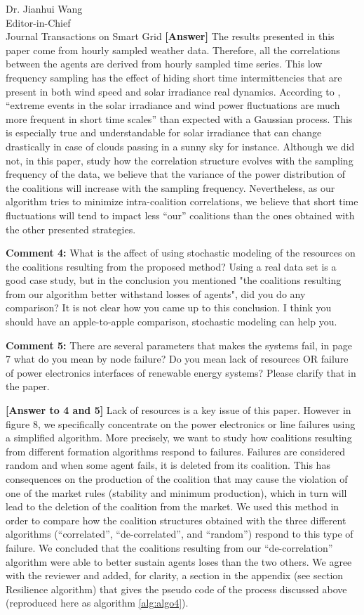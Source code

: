\documentclass{letter}
\begin{document}
\begin{letter}{Dr. Jianhui Wang \\ Editor-in-Chief \\ Journal Transactions on Smart Grid }
\textbf{[Answer]} The results presented in this paper come from hourly sampled weather data. Therefore, all the correlations between the agents are derived from hourly sampled time series. This low frequency sampling has the effect of hiding short time intermittencies that are present in both wind speed and solar irradiance real dynamics. According to \cite{Anvari2015}, “extreme events in the solar irradiance and wind power fluctuations are much more frequent in short time scales” than expected with a Gaussian process. This is especially true and understandable for solar irradiance that can change drastically in case of clouds passing in a sunny sky for instance. Although we did not, in this paper, study how the correlation structure evolves with the sampling frequency of the data, we believe that the variance of the power distribution of the coalitions will increase with the sampling frequency. Nevertheless, as our algorithm tries to minimize intra-coalition correlations, we believe that short time fluctuations will tend to impact less “our” coalitions than the ones obtained with the other presented strategies. 


\textbf{Comment 4:} What is the affect of using stochastic modeling of the resources on the coalitions resulting from the proposed method? Using a real data set is a good case study, but in the conclusion you mentioned "the coalitions resulting from our algorithm better withstand losses of agents", did you do any comparison? It is not clear how you came up to this conclusion. I think you should have an apple-to-apple comparison, stochastic modeling can help you.


\textbf{Comment 5:} There are several parameters that makes the systems fail, in page 7 what do you mean by node failure? Do you mean lack of resources OR failure of power electronics interfaces of renewable energy systems? Please clarify that in the paper.


\textbf{[Answer to 4 and 5]} Lack of resources is a key issue of this paper. However in figure 8, we specifically concentrate on the power electronics or line failures using a simplified algorithm. More precisely, we want to study how coalitions resulting from different formation algorithms respond to failures. Failures are considered random and when some agent fails, it is deleted from its coalition. This has consequences on the production of the coalition that may cause the violation of one of the market rules (stability and minimum production), which in turn will lead to the deletion of the coalition from the market. We used this method in order to compare how the coalition structures obtained with the three different algorithms (“correlated”, “de-correlated”, and “random”) respond to this type of failure. We concluded that the coalitions resulting from our “de-correlation” algorithm were able to better sustain agents loses than the two others. We agree with the reviewer and added, for clarity, a section in the appendix (see section Resilience algorithm) that gives the pseudo code of the process discussed above (reproduced here as algorithm \ref{alg:algo4}).


\end{letter}
\end{document}
